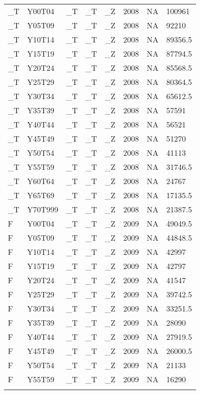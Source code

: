 \begin{longtable}[t]{llllllll}
\_T & Y00T04 & \_T & \_T & \_Z & 2008 & NA & 100961\\
\_T & Y05T09 & \_T & \_T & \_Z & 2008 & NA & 92210\\
\addlinespace
\_T & Y10T14 & \_T & \_T & \_Z & 2008 & NA & 89356.5\\
\_T & Y15T19 & \_T & \_T & \_Z & 2008 & NA & 87794.5\\
\_T & Y20T24 & \_T & \_T & \_Z & 2008 & NA & 85568.5\\
\_T & Y25T29 & \_T & \_T & \_Z & 2008 & NA & 80364.5\\
\_T & Y30T34 & \_T & \_T & \_Z & 2008 & NA & 65612.5\\
\addlinespace
\_T & Y35T39 & \_T & \_T & \_Z & 2008 & NA & 57591\\
\_T & Y40T44 & \_T & \_T & \_Z & 2008 & NA & 56521\\
\_T & Y45T49 & \_T & \_T & \_Z & 2008 & NA & 51270\\
\_T & Y50T54 & \_T & \_T & \_Z & 2008 & NA & 41113\\
\_T & Y55T59 & \_T & \_T & \_Z & 2008 & NA & 31746.5\\
\addlinespace
\_T & Y60T64 & \_T & \_T & \_Z & 2008 & NA & 24767\\
\_T & Y65T69 & \_T & \_T & \_Z & 2008 & NA & 17135.5\\
\_T & Y70T999 & \_T & \_T & \_Z & 2008 & NA & 21387.5\\
F & Y00T04 & \_T & \_T & \_Z & 2009 & NA & 49049.5\\
F & Y05T09 & \_T & \_T & \_Z & 2009 & NA & 44848.5\\
\addlinespace
F & Y10T14 & \_T & \_T & \_Z & 2009 & NA & 42997\\
F & Y15T19 & \_T & \_T & \_Z & 2009 & NA & 42797\\
F & Y20T24 & \_T & \_T & \_Z & 2009 & NA & 41547\\
F & Y25T29 & \_T & \_T & \_Z & 2009 & NA & 39742.5\\
F & Y30T34 & \_T & \_T & \_Z & 2009 & NA & 33251.5\\
\addlinespace
F & Y35T39 & \_T & \_T & \_Z & 2009 & NA & 28090\\
F & Y40T44 & \_T & \_T & \_Z & 2009 & NA & 27919.5\\
F & Y45T49 & \_T & \_T & \_Z & 2009 & NA & 26000.5\\
F & Y50T54 & \_T & \_T & \_Z & 2009 & NA & 21133\\
F & Y55T59 & \_T & \_T & \_Z & 2009 & NA & 16290\\
\addlinespace

\end{longtable}
